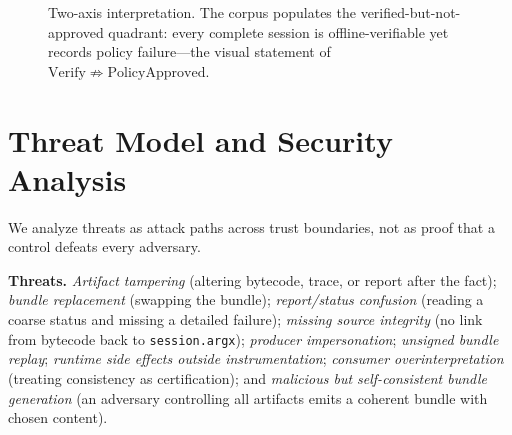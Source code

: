 \documentclass[conference]{IEEEtran}
\newcommand{\code}[1]{\texttt{\small #1}}
\begin{document}
\begin{figure}[t]
\centering
{}
\caption{Two-axis interpretation. The corpus populates the verified-but-not-approved
quadrant: every complete session is offline-verifiable yet records policy failure---the
visual statement of $\mathrm{Verify}\nRightarrow\mathrm{PolicyApproved}$.}
\label{fig:quadrant}
\end{figure}

\section{Threat Model and Security Analysis}\label{sec:threat}
We analyze threats as attack paths across trust boundaries, not as proof that a control
defeats every adversary.

\noindent\textbf{Threats.} \emph{Artifact tampering} (altering bytecode, trace, or report
after the fact); \emph{bundle replacement} (swapping the bundle); \emph{report/status
confusion} (reading a coarse status and missing a detailed failure); \emph{missing source
integrity} (no link from bytecode back to \code{session.argx}); \emph{producer
impersonation}; \emph{unsigned bundle replay}; \emph{runtime side effects outside
instrumentation}; \emph{consumer overinterpretation} (treating consistency as
certification); and \emph{malicious but self-consistent bundle generation} (an adversary
controlling all artifacts emits a coherent bundle with chosen content).
\end{document}

